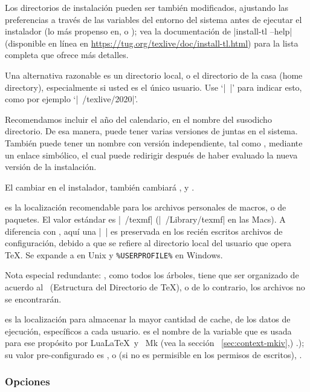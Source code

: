 \documentclass{article}
\begin{document}
Los directorios de instalación pueden ser también modificados, ajustando las preferencias a través de las variables del entorno del sistema antes de ejecutar el instalador (lo más propenso en, 
 o
); vea la documentación de 
|install-tl --help| (disponible en línea en
\url{https://tug.org/texlive/doc/install-tl.html}) para la lista completa que ofrece más detalles.

Una alternativa razonable es un directorio local, o el
directorio de la casa (home directory), especialmente si
usted es el único usuario. Use `|~|' para indicar esto, como
por ejemplo `|~/texlive/2020|'.

Recomendamos incluir el año del calendario, en el nombre del susodicho
directorio. De esa manera, puede tener varias versiones de \TL{}
juntas en el sistema. También puede tener un nombre con versión
independiente, tal como , mediante un
enlace simbólico, el cual puede redirigir después de haber evaluado la
nueva versión de la instalación.

El cambiar  en el instalador, también cambiará
,  y
.

 es la localización recomendable para los archivos
personales de macros, o de paquetes. El valor estándar es |~/texmf| (|~/Library/texmf| en las Macs). A
diferencia con , aquí una |~| es preservada en los
recién escritos archivos de configuración, debido a que se refiere al
directorio local del usuario que opera \TeX. Se expande a
 en Unix y \verb|%USERPROFILE%| en Windows.  

Nota especial redundante:
, como todos los árboles, tiene que ser organizado
de acuerdo al \TDS\ (Estructura del Directorio de \TeX{}), o de lo
contrario, los archivos no se encontrarán. 

 es la localización para almacenar la mayor cantidad
de cache, de los datos de ejecución, específicos a cada usuario.
 es el nombre de la variable que es usada para ese
propósito por Lua\LaTeX\ y \ConTeXt\ Mk (vea la
sección~ \ref{sec:context-mkiv},) \p.\pageref{sec:context-mkiv}); su
valor pre-configurado es , o (si no es permisible en
los permisos de escritos), .

\subsubsection{Opciones}
\label{sec:options}
\end{document}
